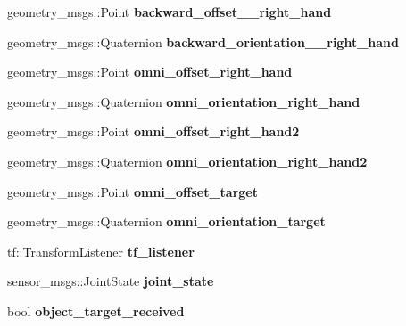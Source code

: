 \begin{DoxyCompactItemize}
geometry\+\_\+msgs\+::\+Point {\bfseries backward\+\_\+offset\+\_\+\_\+right\+\_\+hand}
\item 
\mbox{\label{structManipulate_afad1674f4486ae64188b39dec1edd67b}} 
geometry\+\_\+msgs\+::\+Quaternion {\bfseries backward\+\_\+orientation\+\_\+\_\+right\+\_\+hand}
\item 
\mbox{\label{structManipulate_a9bc19d5268e242572eeba3910d4b1da5}} 
geometry\+\_\+msgs\+::\+Point {\bfseries omni\+\_\+offset\+\_\+right\+\_\+hand}
\item 
\mbox{\label{structManipulate_ac8baa17992e81ae0f45bde74825937e0}} 
geometry\+\_\+msgs\+::\+Quaternion {\bfseries omni\+\_\+orientation\+\_\+right\+\_\+hand}
\item 
\mbox{\label{structManipulate_ad63e48f12e59e83be2e6afdae3d1412f}} 
geometry\+\_\+msgs\+::\+Point {\bfseries omni\+\_\+offset\+\_\+right\+\_\+hand2}
\item 
\mbox{\label{structManipulate_a79634e31c9fecf88044f170258194aaa}} 
geometry\+\_\+msgs\+::\+Quaternion {\bfseries omni\+\_\+orientation\+\_\+right\+\_\+hand2}
\item 
\mbox{\label{structManipulate_af9646af95127e9f76d262cd859e2f981}} 
geometry\+\_\+msgs\+::\+Point {\bfseries omni\+\_\+offset\+\_\+target}
\item 
\mbox{\label{structManipulate_ac8b788cfa67f7d8e278cb06cd25c5e21}} 
geometry\+\_\+msgs\+::\+Quaternion {\bfseries omni\+\_\+orientation\+\_\+target}
\item 
\mbox{\label{structManipulate_a36233231ff52af7e7d630d936ae57248}} 
tf\+::\+Transform\+Listener {\bfseries tf\+\_\+listener}
\item 
\mbox{\label{structManipulate_aa830050fa0e986dfd254ef220ec05da1}} 
sensor\+\_\+msgs\+::\+Joint\+State {\bfseries joint\+\_\+state}
\item 
\mbox{\label{structManipulate_a78bc6e80ed185c9c4888add779728bc1}} 
bool {\bfseries object\+\_\+target\+\_\+received}

\end{DoxyCompactItemize}
